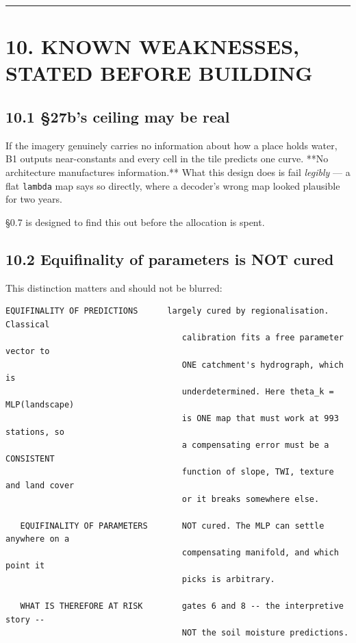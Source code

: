 \documentclass[10pt,a4paper]{article}
\begin{document}
\medskip\hrule\medskip

\section*{10. KNOWN WEAKNESSES, STATED BEFORE BUILDING}

\subsection*{10.1 §27b's ceiling may be real}

If the imagery genuinely carries no information about how a place holds water,
B1 outputs near-constants and every cell in the tile predicts one curve. **No
architecture manufactures information.** What this design does is fail
\emph{legibly} — a flat \texttt{lambda} map says so directly, where a decoder's wrong map
looked plausible for two years.

§0.7 is designed to find this out before the allocation is spent.

\subsection*{10.2 Equifinality of parameters is NOT cured}

This distinction matters and should not be blurred:

\begin{Verbatim}[fontsize=\scriptsize,frame=leftline,framerule=0.6pt,rulecolor=\color{rulegray},xleftmargin=6pt,framesep=6pt,]
   EQUIFINALITY OF PREDICTIONS      largely cured by regionalisation. Classical
                                    calibration fits a free parameter vector to
                                    ONE catchment's hydrograph, which is
                                    underdetermined. Here theta_k = MLP(landscape)
                                    is ONE map that must work at 993 stations, so
                                    a compensating error must be a CONSISTENT
                                    function of slope, TWI, texture and land cover
                                    or it breaks somewhere else.

   EQUIFINALITY OF PARAMETERS       NOT cured. The MLP can settle anywhere on a
                                    compensating manifold, and which point it
                                    picks is arbitrary.

   WHAT IS THEREFORE AT RISK        gates 6 and 8 -- the interpretive story --
                                    NOT the soil moisture predictions.
\end{Verbatim}
\end{document}
